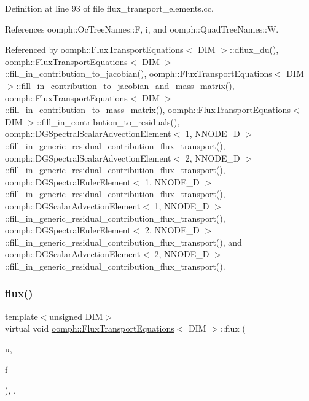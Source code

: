 Definition at line 93 of file flux\+\_\+transport\+\_\+elements.\+cc.



References oomph\+::\+Oc\+Tree\+Names\+::F, i, and oomph\+::\+Quad\+Tree\+Names\+::W.



Referenced by oomph\+::\+Flux\+Transport\+Equations$<$ D\+I\+M $>$\+::dflux\+\_\+du(), oomph\+::\+Flux\+Transport\+Equations$<$ D\+I\+M $>$\+::fill\+\_\+in\+\_\+contribution\+\_\+to\+\_\+jacobian(), oomph\+::\+Flux\+Transport\+Equations$<$ D\+I\+M $>$\+::fill\+\_\+in\+\_\+contribution\+\_\+to\+\_\+jacobian\+\_\+and\+\_\+mass\+\_\+matrix(), oomph\+::\+Flux\+Transport\+Equations$<$ D\+I\+M $>$\+::fill\+\_\+in\+\_\+contribution\+\_\+to\+\_\+mass\+\_\+matrix(), oomph\+::\+Flux\+Transport\+Equations$<$ D\+I\+M $>$\+::fill\+\_\+in\+\_\+contribution\+\_\+to\+\_\+residuals(), oomph\+::\+D\+G\+Spectral\+Scalar\+Advection\+Element$<$ 1, N\+N\+O\+D\+E\+\_\+D $>$\+::fill\+\_\+in\+\_\+generic\+\_\+residual\+\_\+contribution\+\_\+flux\+\_\+transport(), oomph\+::\+D\+G\+Spectral\+Scalar\+Advection\+Element$<$ 2, N\+N\+O\+D\+E\+\_\+D $>$\+::fill\+\_\+in\+\_\+generic\+\_\+residual\+\_\+contribution\+\_\+flux\+\_\+transport(), oomph\+::\+D\+G\+Spectral\+Euler\+Element$<$ 1, N\+N\+O\+D\+E\+\_\+D $>$\+::fill\+\_\+in\+\_\+generic\+\_\+residual\+\_\+contribution\+\_\+flux\+\_\+transport(), oomph\+::\+D\+G\+Scalar\+Advection\+Element$<$ 1, N\+N\+O\+D\+E\+\_\+D $>$\+::fill\+\_\+in\+\_\+generic\+\_\+residual\+\_\+contribution\+\_\+flux\+\_\+transport(), oomph\+::\+D\+G\+Spectral\+Euler\+Element$<$ 2, N\+N\+O\+D\+E\+\_\+D $>$\+::fill\+\_\+in\+\_\+generic\+\_\+residual\+\_\+contribution\+\_\+flux\+\_\+transport(), and oomph\+::\+D\+G\+Scalar\+Advection\+Element$<$ 2, N\+N\+O\+D\+E\+\_\+D $>$\+::fill\+\_\+in\+\_\+generic\+\_\+residual\+\_\+contribution\+\_\+flux\+\_\+transport().

\mbox{\label{classoomph_1_1FluxTransportEquations_ab6ed40337620462e5c6e992081c1612a}} 
\subsubsection{\texorpdfstring{flux()}{flux()}}
{\footnotesize\ttfamily template$<$unsigned D\+IM$>$ \\
virtual void \hyperlink{classoomph_1_1FluxTransportEquations}{oomph\+::\+Flux\+Transport\+Equations}$<$ D\+IM $>$\+::flux (\begin{DoxyParamCaption}\item[{const \hyperlink{classoomph_1_1Vector}{Vector}$<$ double $>$ \&}]{u,  }\item[{\hyperlink{classoomph_1_1DenseMatrix}{Dense\+Matrix}$<$ double $>$ \&}]{f }\end{DoxyParamCaption})\hspace{0.3cm}{\ttfamily [inline]}, {\ttfamily [protected]}, {\ttfamily [virtual]}}



